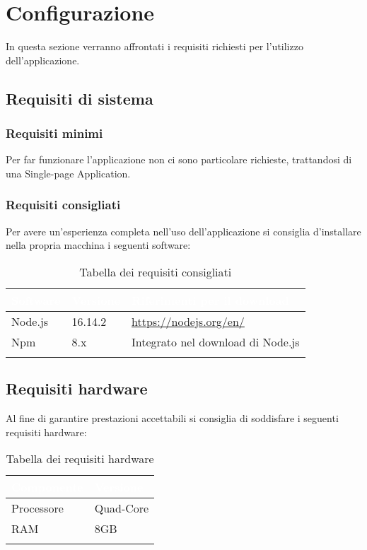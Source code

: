 \chapter{Configurazione}
In questa sezione verranno affrontati i requisiti richiesti per l'utilizzo dell'applicazione.

\section{Requisiti di sistema}
    \subsection{Requisiti minimi}
        Per far funzionare l'applicazione non ci sono particolare richieste, trattandosi di una Single-page Application.

    \subsection{Requisiti consigliati}
        Per avere un'esperienza completa nell'uso dell'applicazione si consiglia d'installare nella propria macchina i seguenti software:
        \renewcommand\arraystretch{1,5}
        \begin{longtable}{|p{2cm}|p{2cm}|p{6cm}|}
            \hline
            \rowcolor[HTML]{036400}
            \textcolor{white}{\textbf{Software}} & \textcolor{white}{\textbf{Versione}} & \textcolor{white}{\textbf{Riferimenti per il download}} \\ \hline
                \rowcolor[HTML]{EFEFEF}
                Node.js & 16.14.2 & \href{https://nodejs.org/en/}{https://nodejs.org/en/}  \\ \hline
                \rowcolor[HTML]{C0C0C0}
                Npm & 8.x & Integrato nel download di Node.js \\ \hline
                \caption{Tabella dei requisiti consigliati}
        \end{longtable}
        \renewcommand\arraystretch{1}

\section{Requisiti hardware}
        Al fine di garantire prestazioni accettabili si consiglia di soddisfare i seguenti requisiti hardware:
        \renewcommand\arraystretch{1,5}
        \begin{longtable}{|p{3cm}|p{3cm}|}
            \hline
            \rowcolor[HTML]{036400}
            \textcolor{white}{\textbf{Componente}} & \textcolor{white}{\textbf{Versione}} \\ \hline
                \rowcolor[HTML]{EFEFEF}
                Processore & Quad-Core \\ \hline
                \rowcolor[HTML]{C0C0C0}
                RAM & 8GB \\ \hline
                \caption{Tabella dei requisiti hardware}
        \end{longtable}
        \renewcommand\arraystretch{1}

